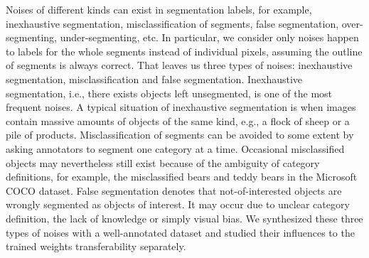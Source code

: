 


Noises of different kinds can exist in segmentation labels, for example, inexhaustive segmentation, misclassification of segments, false segmentation, over-segmenting, under-segmenting, etc.
In particular, we consider only noises happen to labels for the whole segments instead of individual pixels, assuming the outline of segments is always correct.
That leaves us three types of noises: inexhaustive segmentation, misclassification and false segmentation.
Inexhaustive segmentation, i.e., there exists objects left unsegmented, is one of the most frequent noises.
A typical situation of inexhaustive segmentation is when images contain massive amounts of objects of the same kind, e.g., a flock of sheep or a pile of products.
Misclassification of segments can be avoided to some extent by asking annotators to segment one category at a time.\cite{lin2014microsoft}
Occasional misclassified objects may nevertheless still exist because of the ambiguity of category definitions, for example, the misclassified bears and teddy bears in the Microsoft COCO dataset.
False segmentation denotes that not-of-interested objects are wrongly segmented as objects of interest.
It may occur due to unclear category definition, the lack of knowledge or simply visual bias.
We synthesized these three types of noises with a well-annotated dataset and studied their influences to the trained weights transferability separately.




